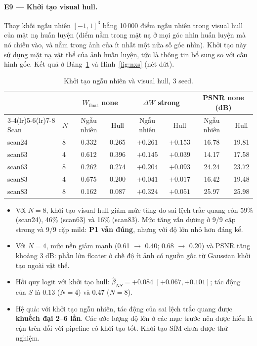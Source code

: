 \documentclass[11pt,a4paper]{article}
\begin{document}
\paragraph{E9 --- Khởi tạo visual hull.} Thay khối ngẫu nhiên $[-1,1]^3$ bằng 10\,000 điểm ngẫu nhiên trong visual hull của mặt nạ huấn luyện (điểm nằm trong mặt nạ ở mọi góc nhìn huấn luyện mà nó chiếu vào, và nằm trong ảnh của ít nhất một nửa số góc nhìn). Khởi tạo này sử dụng mặt nạ vật thể của ảnh huấn luyện, tức là thông tin bổ sung so với cấu hình gốc. Kết quả ở Bảng~\ref{tab:hull} và Hình~\ref{fig:nxs} (nét đứt).
\begin{table}[H]
\centering\small
\caption{Khởi tạo ngẫu nhiên và visual hull, 3 seed.}
\label{tab:hull}
\begin{tabular}{@{}llcccccc@{}}
\toprule
& & \multicolumn{2}{c}{$W_{\text{float}}$ none} & \multicolumn{2}{c}{$\Delta W$ strong} & \multicolumn{2}{c}{PSNR none (dB)} \\
\cmidrule(lr){3-4}\cmidrule(lr){5-6}\cmidrule(lr){7-8}
Scan & $N$ & Ngẫu nhiên & Hull & Ngẫu nhiên & Hull & Ngẫu nhiên & Hull \\
\midrule
scan24 & 8 & 0.332 & 0.265 & $+0.261$ & $+0.153$ & 16.78 & 19.81 \\
scan63 & 4 & 0.612 & 0.396 & $+0.145$ & $+0.039$ & 14.17 & 17.58 \\
scan63 & 8 & 0.262 & 0.274 & $+0.204$ & $+0.093$ & 24.24 & 23.72 \\
scan83 & 4 & 0.675 & 0.200 & $+0.041$ & $+0.017$ & 16.42 & 19.48 \\
scan83 & 8 & 0.162 & 0.087 & $+0.324$ & $+0.051$ & 25.97 & 25.98 \\
\bottomrule
\end{tabular}
\end{table}
\begin{itemize}
  \item Với $N=8$, khởi tạo visual hull giảm mức tăng do sai lệch trắc quang còn 59\% (scan24), 46\% (scan63) và 16\% (scan83). Mức tăng vẫn dương ở 9/9 cặp strong và 9/9 cặp mild: \textbf{P1 vẫn đúng}, nhưng với độ lớn nhỏ hơn đáng kể.
  \item Với $N=4$, mức nền giảm mạnh (0.61 $\to$ 0.40; 0.68 $\to$ 0.20) và PSNR tăng khoảng 3 dB: phần lớn floater ở chế độ ít ảnh có nguồn gốc từ Gaussian khởi tạo ngoài vật thể.
  \item Hồi quy logit với khởi tạo hull: $\hat\beta_{NS}=+0.084$ $[+0.067, +0.101]$; tác động của $S$ là 0.13 ($N=4$) và 0.47 ($N=8$).
  \item Hệ quả: với khởi tạo ngẫu nhiên, tác động của sai lệch trắc quang được \textbf{khuếch đại 2--6 lần}. Các ước lượng độ lớn ở các mục trước nên được hiểu là cận trên đối với pipeline có khởi tạo tốt. Khởi tạo SfM chưa được thử nghiệm.
\end{itemize}
\end{document}
